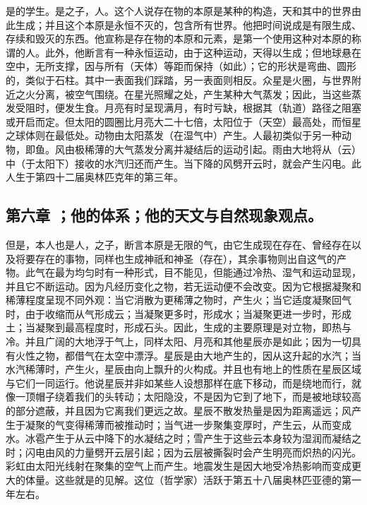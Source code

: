 是的学生。是之子，人。这个人说存在物的本原是某种的构造，天和其中的世界由此生成；并且这个本原是永恒不灭的，包含所有世界。他把时间说成是有限生成、存续和毁灭的东西。他宣称是存在物的本原和元素，是第一个使用这种对本原的称谓的人。此外，他断言有一种永恒运动，由于这种运动，天得以生成；但地球悬在空中，无所支撑，因与所有（天体）等距而保持（如此）；它的形状是弯曲、圆形的，类似于石柱。其中一表面我们踩踏，另一表面则相反。众星是火圈，与世界附近之火分离，被空气围绕。在星光照耀之处，产生某种大气蒸发；因此，当这些蒸发受阻时，便发生食。月亮有时呈现满月，有时亏缺，根据其（轨道）路径之阻塞或开启而定。但太阳的圆圈比月亮大二十七倍，太阳位于（天空）最高处，而恒星之球体则在最低处。动物由太阳蒸发（在湿气中）产生。人最初类似于另一种动物，即鱼。风由极稀薄的大气蒸发分离并凝结后的运动引起。雨由大地将从（云）中（于太阳下）接收的水汽归还而产生。当下降的风劈开云时，就会产生闪电。此人生于第四十二届奥林匹克年的第三年。\par


\subsection{第六章 ；他的体系；他的天文与自然现象观点。}

但是，本人也是人，之子，断言本原是无限的气，由它生成现在存在、曾经存在以及将要存在的事物，同样也生成神祇和神圣（存在），其余事物则出自这气的产物。此气在最为均匀时有一种形式，目不能见，但能通过冷热、湿气和运动显现，并且它不断运动。因为凡经历变化之物，若无运动便不会改变。因为它根据凝聚和稀薄程度呈现不同外观：当它消散为更稀薄之物时，产生火；当它适度凝聚回气时，由于收缩而从气形成云；当凝聚更多时，形成水；当凝聚更进一步时，形成土；当凝聚到最高程度时，形成石头。因此，生成的主要原理是对立物，即热与冷。并且广阔的大地浮于气上，同样太阳、月亮和其他星辰亦是如此；因为一切具有火性之物，都借气在太空中漂浮。星辰是由大地产生的，因从这升起的水汽；当水汽稀薄时，产生火，星辰由向上飘升的火构成。并且也有地上的性质在星辰区域与它们一同运行。他说星辰并非如某些人设想那样在底下移动，而是绕地而行，就像一顶帽子绕着我们的头转动；太阳隐没，不是因为它到了地下，而是被地球较高的部分遮蔽，并且因为它离我们更远之故。星辰不散发热量是因为距离遥远；风产生于凝聚的气变得稀薄而被推动时；当气进一步聚集变厚时，产生云，从而变成水。冰雹产生于从云中降下的水凝结之时；雪产生于这些云本身较为湿润而凝结之时；闪电由风的力量劈开云层引起；因为云层被撕裂时会产生明亮而炽热的闪光。彩虹由太阳光线射在聚集的空气上而产生。地震发生是因大地受冷热影响而变成更大的体量。这些就是的见解。这位（哲学家）活跃于第五十八届奥林匹亚德的第一年左右。\par

